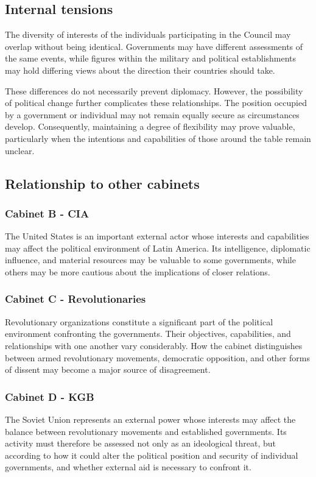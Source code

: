 \subsection{Internal tensions}

The diversity of interests of the individuals participating in the Council may overlap without being identical. Governments may have different assessments of the same events, while figures within the military and political establishments may hold differing views about the direction their countries should take.

These differences do not necessarily prevent diplomacy. However, the possibility of political change further complicates these relationships. The position occupied by a government or individual may not remain equally secure as circumstances develop. Consequently, maintaining a degree of flexibility may prove valuable, particularly when the intentions and capabilities of those around the table remain unclear.

\subsection{Relationship to other cabinets}

\subsubsection{Cabinet B - CIA}

The United States is an important external actor whose interests and capabilities may affect the political environment of Latin America. Its intelligence, diplomatic influence, and material resources may be valuable to some governments, while others may be more cautious about the implications of closer relations.

\subsubsection{Cabinet C - Revolutionaries}

Revolutionary organizations constitute a significant part of the political environment confronting the governments. Their objectives, capabilities, and relationships with one another vary considerably. How the cabinet distinguishes between armed revolutionary movements, democratic opposition, and other forms of dissent may become a major source of disagreement.

\subsubsection{Cabinet D - KGB}

The Soviet Union represents an external power whose interests may affect the balance between revolutionary movements and established governments. Its activity must therefore be assessed not only as an ideological threat, but according to how it could alter the political position and security of individual governments, and whether external aid is necessary to confront it.
